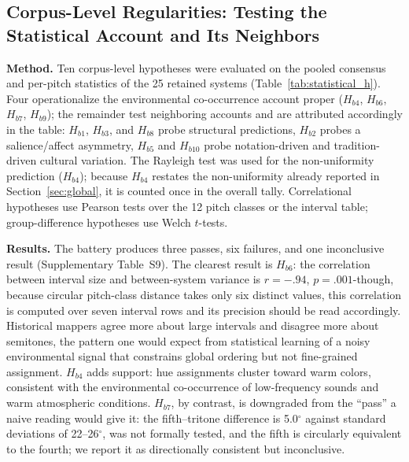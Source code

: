 \documentclass[12pt]{article}
\begin{document}

\subsection{Corpus-Level Regularities: Testing the Statistical Account
and Its Neighbors}

\textbf{Method.} Ten corpus-level hypotheses were evaluated on the
pooled consensus and per-pitch statistics of the 25 retained systems
(Table~\ref{tab:statistical_h}). Four operationalize the environmental
co-occurrence account proper ($H_{b4}$, $H_{b6}$, $H_{b7}$, $H_{b9}$);
the remainder test neighboring accounts and are attributed accordingly
in the table: $H_{b1}$, $H_{b3}$, and $H_{b8}$ probe structural
predictions, $H_{b2}$ probes a salience/affect asymmetry, $H_{b5}$
and $H_{b10}$ probe notation-driven and tradition-driven cultural
variation. The Rayleigh
test \citep{mardia1972} was used for the non-uniformity prediction
($H_{b4}$); because $H_{b4}$ restates the non-uniformity already
reported in Section~\ref{sec:global}, it is counted once in the
overall tally. Correlational hypotheses use Pearson tests over the 12
pitch classes or the interval table; group-difference hypotheses use
Welch $t$-tests.

\textbf{Results.} The battery produces three passes, six failures, and
one inconclusive result (Supplementary Table~S9). The clearest result is $H_{b6}$: the
correlation between interval size and between-system variance is
$r = -.94$, $p = .001$-though, because circular pitch-class distance
takes only six distinct values, this correlation is computed over
seven interval rows and its precision should be read accordingly.
Historical
mappers agree more about large intervals and disagree more about
semitones, the pattern one would expect from statistical learning of a
noisy environmental signal that constrains global ordering but not
fine-grained assignment. $H_{b4}$ adds support: hue assignments
cluster toward warm colors, consistent with the environmental
co-occurrence of low-frequency sounds and warm atmospheric conditions.
$H_{b7}$, by contrast, is downgraded from the ``pass'' a naive reading
would give it: the fifth--tritone difference is 5.0$^\circ$ against
standard deviations of 22--26$^\circ$, was not formally tested, and the
fifth is circularly equivalent to the fourth; we report it as
directionally consistent but inconclusive.

\end{document}
